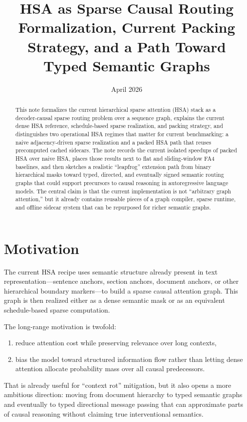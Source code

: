 \documentclass[11pt]{article}
\title{HSA as Sparse Causal Routing\\
\large Formalization, Current Packing Strategy, and a Path Toward Typed Semantic Graphs}
\author{}
\date{April 2026}
\begin{document}
\maketitle

\begin{abstract}
This note formalizes the current hierarchical sparse attention (HSA) stack as a
decoder-causal sparse routing problem over a sequence graph, explains the
current dense HSA reference, schedule-based sparse realization, and packing
strategy, and distinguishes two operational HSA regimes that matter for current
benchmarking: a naive adjacency-driven sparse realization and a packed HSA path
that reuses precomputed cached sidecars. The note records the current isolated
speedups of packed HSA over naive HSA, places those results next to flat and
sliding-window FA4 baselines, and then sketches a realistic ``leapfrog''
extension path from binary hierarchical masks toward typed, directed, and
eventually signed semantic routing graphs that could support precursors to
causal reasoning in autoregressive language models. The central claim is that
the current implementation is not ``arbitrary graph attention,'' but it already
contains reusable pieces of a graph compiler, sparse runtime, and offline
sidecar system that can be repurposed for richer semantic graphs.
\end{abstract}

\section{Motivation}

The current HSA recipe uses semantic structure already present in text
representation---sentence anchors, section anchors, document anchors, or other
hierarchical boundary markers---to build a sparse causal attention graph. This
graph is then realized either as a dense semantic mask or as an equivalent
schedule-based sparse computation.

The long-range motivation is twofold:
\begin{enumerate}[leftmargin=1.5em]
    \item reduce attention cost while preserving relevance over long contexts,
    \item bias the model toward structured information flow rather than letting
    dense attention allocate probability mass over all causal predecessors.
\end{enumerate}

That is already useful for ``context rot'' mitigation, but it also opens a more
ambitious direction: moving from document hierarchy to typed semantic graphs and
eventually to typed directional message passing that can approximate parts of
causal reasoning without claiming true interventional semantics.
\end{document}
